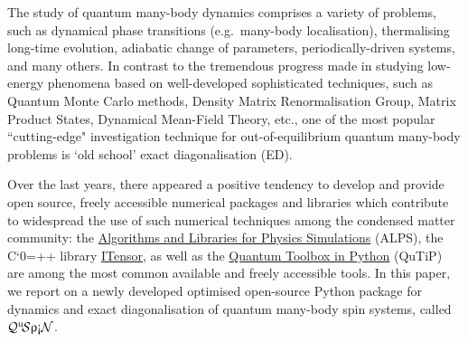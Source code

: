 \documentclass{SciPost}
\newcommand\0{\scalebox{-1}[1]{0}}
\let\svttfamily\ttfamily
\renewcommand\ttfamily{\svttfamily\catcode`0=\active }
\renewcommand\texttt{\bgroup\ttfamily\texttthelp}
\def\texttthelp#1{#1\egroup}
\newcommand{\qspin}{$\mathcal{Q}^{\mathrm{u}}\!\mathcal{S}\uprho\mathrm{\text{\textexclamdown}}\mathcal{N}$}
\newcommand*{\cyan}{\textcolor{cyan}}
\begin{document}

The study of quantum many-body dynamics comprises a variety of problems, such as dynamical phase transitions (e.g.~many-body localisation), thermalising long-time evolution, adiabatic change of parameters, periodically-driven systems, and many others. In contrast to the tremendous progress made in studying low-energy phenomena based on well-developed sophisticated techniques, such as Quantum Monte Carlo methods, Density Matrix Renormalisation Group, Matrix Product States, Dynamical Mean-Field Theory, etc., one of the most popular ``cutting-edge" investigation technique for out-of-equilibrium quantum many-body problems is `old school' exact diagonalisation (ED). 

Over the last years, there appeared a positive tendency to develop and provide open source, freely accessible numerical packages and libraries which contribute to widespread the use of such numerical techniques among the condensed matter community: the \href{http://alps.comp-phys.org/mediawiki/index.php/Main_Page}{Algorithms and Libraries for Physics Simulations} (ALPS), the C\texttt{++} library \href{http://itensor.org/}{ITensor}, as well as the \href{http://qutip.org/}{Quantum Toolbox in Python} (QuTiP) are among the most common available and freely accessible tools. In this paper, we report on a newly developed optimised open-source Python package for dynamics and exact diagonalisation of quantum many-body spin systems, called \qspin. 
\end{document}
